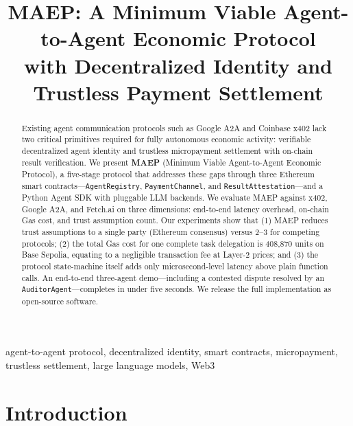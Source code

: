 \documentclass[conference]{IEEEtran}
\begin{document}
\title{MAEP: A Minimum Viable Agent-to-Agent Economic Protocol\\
with Decentralized Identity and Trustless Payment Settlement}

\author{
}

\maketitle

\begin{abstract}
Existing agent communication protocols such as Google A2A and Coinbase
x402 lack two critical primitives required for fully autonomous economic
activity: verifiable decentralized agent identity and trustless
micropayment settlement with on-chain result verification.  We present
\textbf{MAEP} (Minimum Viable Agent-to-Agent Economic Protocol), a
five-stage protocol that addresses these gaps through three Ethereum
smart contracts---\texttt{AgentRegistry}, \texttt{PaymentChannel}, and
\texttt{ResultAttestation}---and a Python Agent SDK with pluggable LLM
backends.  We evaluate MAEP against x402, Google A2A, and Fetch.ai on
three dimensions: end-to-end latency overhead, on-chain Gas cost, and
trust assumption count.  Our experiments show that (1) MAEP reduces
trust assumptions to a single party (Ethereum consensus) versus 2--3
for competing protocols; (2) the total Gas cost for one complete task
delegation is 408,870 units on Base Sepolia, equating to a negligible
transaction fee at Layer-2 prices; and (3) the protocol state-machine
itself adds only microsecond-level latency above plain function calls.
An end-to-end three-agent demo---including a contested dispute
resolved by an \texttt{AuditorAgent}---completes in under five seconds.
We release the full implementation as open-source software.
\end{abstract}

\begin{IEEEkeywords}
agent-to-agent protocol, decentralized identity, smart contracts,
micropayment, trustless settlement, large language models, Web3
\end{IEEEkeywords}

\section{Introduction}
\label{sec:intro}
\end{document}
